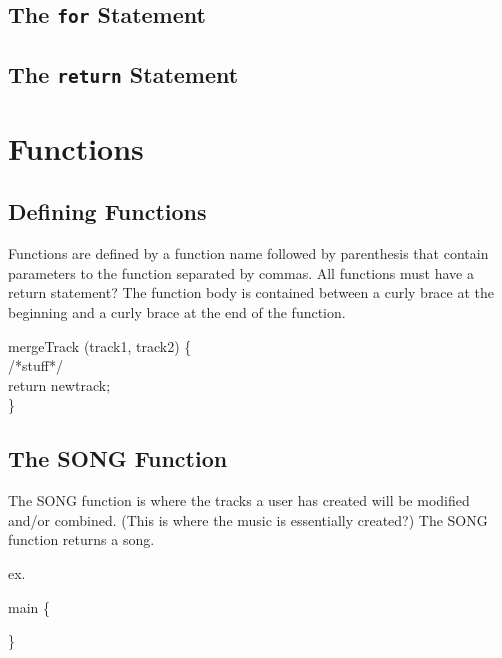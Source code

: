 \documentclass[letterpaper]{article}
\begin{document}
\subsection{The \texttt{for} Statement}
\subsection{The \texttt{return} Statement}
\section{Functions}
\subsection{Defining Functions}
Functions are defined by a function name followed by parenthesis that contain parameters to the function separated by commas. All functions must have a return statement? The function body is contained between a curly brace at the beginning and a curly brace at the end of the function.

mergeTrack (track1, track2) \{ \\
		/*stuff*/ \\
	return newtrack;\\
\}


\subsection{The SONG Function}
The SONG function is where the tracks a user has created will be modified and/or combined. (This is where the music is essentially created?) The SONG function returns a song.

ex.

main \{

\}
\end{document}
